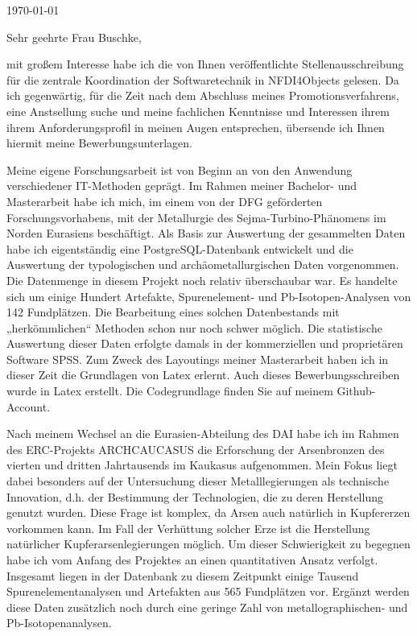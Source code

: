 \documentclass[10pt, a4paper]{article}
\begin{document}
\makeprofile %

\makecontact %

\today %

\makeemployerinfo %

Sehr geehrte Frau Buschke,

mit großem Interesse habe ich die von Ihnen veröffentlichte Stellenausschreibung für die zentrale Koordination der Softwaretechnik in NFDI4Objects gelesen. Da ich gegenwärtig, für die Zeit nach dem Abschluss meines Promotionsverfahrens, eine Anstsellung suche und meine fachlichen Kenntnisse und Interessen ihrem ihrem Anforderungsprofil in meinen Augen entsprechen, übersende ich Ihnen hiermit meine Bewerbungsunterlagen.

Meine eigene Forschungsarbeit ist von Beginn an von den Anwendung verschiedener IT-Methoden geprägt. Im Rahmen meiner Bachelor- und Masterarbeit habe ich mich, im einem von der DFG geförderten Forschungsvorhabens, mit der Metallurgie des Sejma-Turbino-Phänomens im Norden Eurasiens beschäftigt. Als Basis zur Auswertung der gesammelten Daten habe ich eigentständig eine PostgreSQL-Datenbank entwickelt und die Auswertung der typologischen und archäometallurgischen Daten vorgenommen. Die Datenmenge in diesem Projekt noch relativ überschaubar war. Es handelte sich um einige Hundert Artefakte, Spurenelement- und Pb-Isotopen-Analysen von 142 Fundplätzen. Die Bearbeitung eines solchen Datenbestands mit „herkömmlichen“ Methoden schon nur noch schwer möglich. Die statistische Auswertung dieser Daten erfolgte damals in der kommerziellen und proprietären Software SPSS. Zum Zweck des Layoutings meiner Masterarbeit haben ich in dieser Zeit die Grundlagen von Latex erlernt. Auch dieses Bewerbungsschreiben wurde in Latex erstellt. Die Codegrundlage finden Sie auf meinem Github-Account.

Nach meinem Wechsel an die Eurasien-Abteilung des DAI habe ich im Rahmen des ERC-Projekts ARCHCAUCASUS die Erforschung der Arsenbronzen des vierten und dritten Jahrtausends im Kaukasus aufgenommen. Mein Fokus liegt dabei besonders auf der Untersuchung dieser Metalllegierungen als technische Innovation, d.h. der Bestimmung der Technologien, die zu deren Herstellung genutzt wurden. Diese Frage ist komplex, da Arsen auch natürlich in Kupfererzen vorkommen kann. Im Fall der Verhüttung solcher Erze ist die Herstellung natürlicher Kupferarsenlegierungen möglich. Um dieser Schwierigkeit zu begegnen habe ich vom Anfang des Projektes an einen quantitativen Ansatz verfolgt. Insgesamt liegen in der Datenbank zu diesem Zeitpunkt einige Tausend Spurenelementanalysen und Artefakten aus 565 Fundplätzen vor. Ergänzt werden diese Daten zusätzlich noch durch eine geringe Zahl von metallographischen- und Pb-Isotopenanalysen. 
\end{document}
